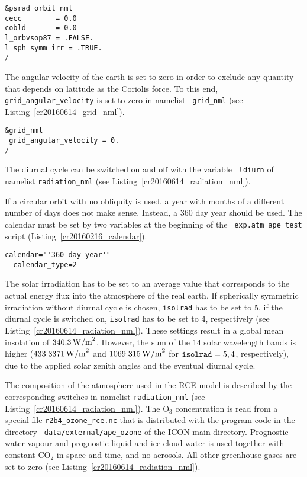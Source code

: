 \begin{lstlisting}[caption=Orbit namelist {\tt psrad\_orbit\_nml} for
  RCE in {\tt exp.atm\_rce\_test}, label=cr20160614_psrad_orbit_nml]
&psrad_orbit_nml
cecc        = 0.0
cobld       = 0.0
l_orbvsop87 = .FALSE.
l_sph_symm_irr = .TRUE.
/
\end{lstlisting} 

The angular velocity of the earth is set to zero in order to exclude
any quantity that depends on latitude as the Coriolis force. To this
end, {\tt grid\_angular\_velocity} is set to zero in namelist {\tt
  grid\_nml} (see Listing~\ref{cr20160614_grid_nml}).

\begin{lstlisting}[caption=Grid namelist {\tt grid\_nml} for RCE in {\tt
    exp.atm\_rce\_test}, label=cr20160614_grid_nml]
&grid_nml
 grid_angular_velocity = 0.
/
\end{lstlisting}

The diurnal cycle can be switched on and off with the variable {\tt
  ldiurn} of namelist {\tt radiation\_nml} (see
Listing~\ref{cr20160614_radiation_nml}).

If a circular orbit with no obliquity is used, a year with months of a
different number of 
days does not make sense. Instead, a 360 day year should be used.
The calendar must be set by two variables at the beginning of the {\tt
  exp.atm\_ape\_test} script (Listing~\ref{cr20160216_calendar}).

\begin{lstlisting}[caption=Calendar for APE ({\tt
    exp.atm\_ape\_test}), label=cr20160216_calendar]
  calendar="'360 day year'"
  calendar_type=2
\end{lstlisting}

The solar irradiation has to be set to an average value that
corresponds to the actual energy flux into the atmosphere of the real
earth. If spherically symmetric irradiation without diurnal cycle is
chosen, {\tt isolrad} has to be set to 5, if the diurnal cycle is
switched on, {\tt isolrad} has to be set to 4, respectively (see
Listing~\ref{cr20160614_radiation_nml}). These settings result in a global mean
insolation of $340.3\,{\rm W/m}^2$. However, the sum of the 14 solar
wavelength bands is higher ($433.3371\,{\rm W/m}^2$ and
$1069.315\,{\rm W/m}^2$ for ${\tt isolrad}=5,4$, respectively), due to
the applied solar zenith angles and the eventual diurnal cycle. 

The
composition of the 
atmosphere used in the RCE model is described by the corresponding
switches in namelist {\tt radiation\_nml} (see
Listing~\ref{cr20160614_radiation_nml}). The O$_3$ concentration
is read from a special file {\tt r2b4\_ozone\_rce.nc} that is
distributed with the program code in the directory {\tt
  data/external/ape\_ozone} of the ICON main directory. Prognostic
water vapour and prognostic liquid and ice cloud water is used
together with constant CO$_2$ in space and time, and no
aerosols. All 
other greenhouse gases are set to zero
(see Listing~\ref{cr20160614_radiation_nml}). 

